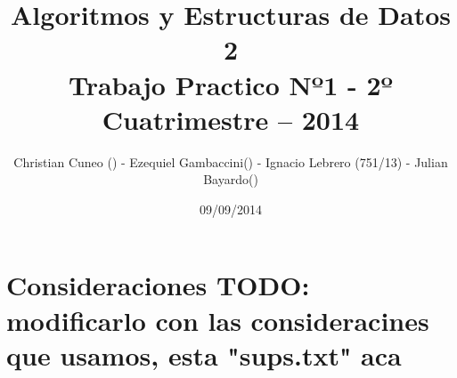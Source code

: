 \documentclass[a4paper, 10pt]{article}
\title{Algoritmos y Estructuras de Datos 2 \\ Trabajo Practico Nº1 - 2º Cuatrimestre – 2014}
\author{Christian Cuneo () - Ezequiel Gambaccini() - Ignacio Lebrero (751/13) - Julian Bayardo()}
\date{09/09/2014}
\begin{document}
    \maketitle
    \section*{Consideraciones TODO: modificarlo con las consideracines que usamos, esta "sups.txt" aca}
        
    \clearpage
        
    \clearpage
\end{document}
